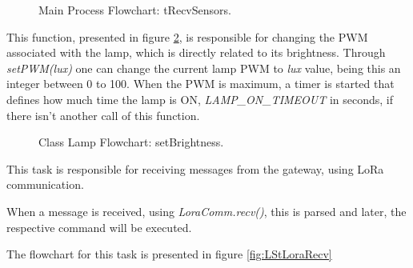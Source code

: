 \begin{figure}[H]
	\centering
	\caption{Main Process Flowchart: tRecvSensors.}
	\label{fig:flow_trecv_sensors}
\end{figure}

\clearpage
%
%


This function, presented in figure \ref{fig:flow_setbrightness}, is responsible for changing the PWM associated with the lamp, which is directly related to its brightness. Through \textit{setPWM(lux)} one can change the current lamp PWM to \textit{lux} value, being this an integer between 0 to 100. When the PWM is maximum, a timer is started that defines how much time the lamp is ON, \textit{LAMP\_ON\_TIMEOUT} in seconds, if there isn't another call of this function.

\begin{figure}[H]
	\centering	
	\caption{Class Lamp Flowchart: setBrightness.}
	\label{fig:flow_setbrightness}
\end{figure}


\clearpage
{}

This task is responsible for receiving messages from the gateway, using LoRa communication.

When a message is received, using \textit{LoraComm.recv()}, this is parsed and later, the respective command will be executed.

The flowchart for this task is presented in figure \ref{fig:LStLoraRecv}

